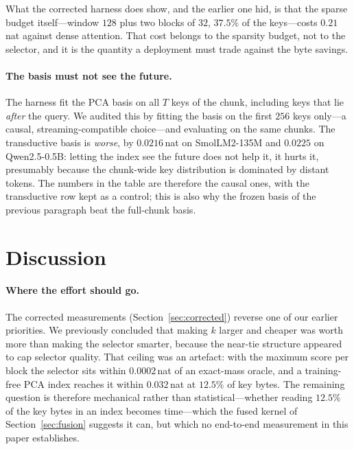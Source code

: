 \documentclass[sigconf,nonacm,11pt]{acmart}
\begin{document}
What the corrected harness does show, and the earlier one hid, is that the
sparse budget itself---window $128$ plus two blocks of $32$, $37.5\%$ of
the keys---costs $0.21$\,nat against dense attention. That cost belongs
to the sparsity budget, not to the selector, and it is the quantity a
deployment must trade against the byte savings.

\paragraph{The basis must not see the future.} The harness fit the PCA
basis on all $T$ keys of the chunk, including keys that lie \emph{after} the
query. We audited this by fitting the basis on the first $256$ keys only---a
causal, streaming-compatible choice---and evaluating on the same chunks. The
transductive basis is \emph{worse}, by $0.0216$\,nat on SmolLM2-135M and
$0.0225$ on Qwen2.5-0.5B: letting the index see the future does not help it,
it hurts it, presumably because the chunk-wide key distribution is dominated
by distant tokens. The numbers in the table are therefore the causal ones,
with the transductive row kept as a control; this is also why the frozen
basis of the previous paragraph beat the full-chunk basis.

\section{Discussion}\label{sec:disc}

\paragraph{Where the effort should go.} The corrected measurements
(Section~\ref{sec:corrected}) reverse one of our earlier priorities. We previously
concluded that making $k$ larger and cheaper was worth more than making the
selector smarter, because the near-tie structure appeared to cap selector quality.
That ceiling was an artefact: with the maximum score per block the selector sits
within $0.0002$\,nat of an exact-mass oracle, and a training-free PCA index reaches
it within $0.032$\,nat at $12.5\%$ of key bytes. The remaining question is
therefore mechanical rather than statistical---whether reading $12.5\%$ of the key
bytes in an index becomes time---which the fused kernel of
Section~\ref{sec:fusion} suggests it can, but which no end-to-end measurement in
this paper establishes.
\end{document}
